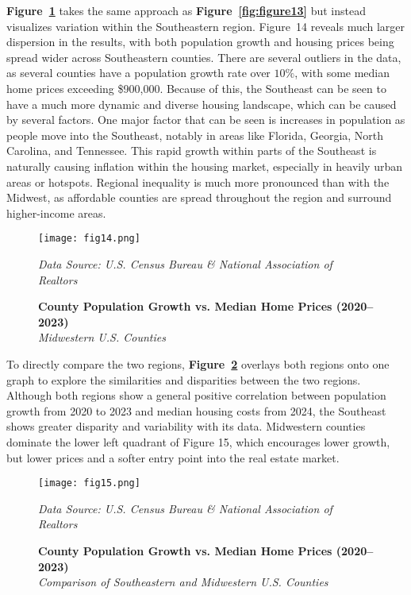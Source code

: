 \documentclass[journal,article,submit,pdftex,moreauthors]{Definitions/mdpi}
\begin{document}
\textbf{Figure~\ref{fig:figure14}} takes the same approach as \textbf{Figure~\ref{fig:figure13}} but instead visualizes variation within the Southeastern region. Figure~14 reveals much larger dispersion in the results, with both population growth and housing prices being spread wider across Southeastern counties. There are several outliers in the data, as several counties have a population growth rate over $10\%$, with some median home prices exceeding \$900{,}000. Because of this, the Southeast can be seen to have a much more dynamic and diverse housing landscape, which can be caused by several factors. One major factor that can be seen is increases in population as people move into the Southeast, notably in areas like Florida, Georgia, North Carolina, and Tennessee. This rapid growth within parts of the Southeast is naturally causing inflation within the housing market, especially in heavily urban areas or hotspots. Regional inequality is much more pronounced than with the Midwest, as affordable counties are spread throughout the region and surround higher-income areas.

\begin{figure}[H]
  \centering
  \texttt{[image: fig14.png]}
  \caption{\textbf{County Population Growth vs. Median Home Prices (2020–2023)}\\
  \textit{Midwestern U.S. Counties}}
  \label{fig:figure14}
  \vspace{1ex}
  {\footnotesize\textit{Data Source: U.S. Census Bureau \& National Association of Realtors}}
\end{figure}
 
To directly compare the two regions, \textbf{Figure~\ref{fig:figure15}} overlays both regions onto one graph to explore the similarities and disparities between the two regions. Although both regions show a general positive correlation between population growth from 2020 to 2023 and median housing costs from 2024, the Southeast shows greater disparity and variability with its data. Midwestern counties dominate the lower left quadrant of Figure 15, which encourages lower growth, but lower prices and a softer entry point into the real estate market.

\begin{figure}[H]
  \centering
  \texttt{[image: fig15.png]}
  \caption{\textbf{County Population Growth vs. Median Home Prices (2020–2023)}\\
  \textit{Comparison of Southeastern and Midwestern U.S. Counties}}
  \label{fig:figure15}
  \vspace{1ex}
  {\footnotesize\textit{Data Source: U.S. Census Bureau \& National Association of Realtors}}
\end{figure}
\end{document}
